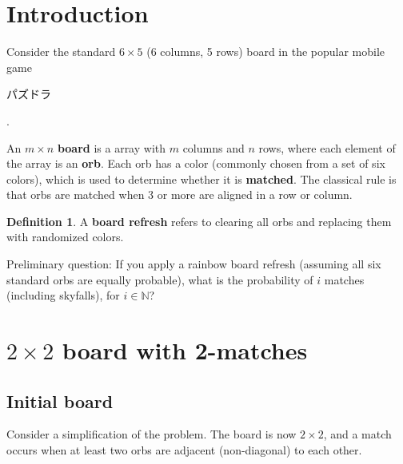 \documentclass[12pt]{article}
\newcommand{\N}{\mathbb{N}}
\theoremstyle{definition}
\newtheorem{definition}{Definition}[section]
\begin{document}
\tableofcontents
\section{Introduction}
Consider the standard $6\times 5$ (6 columns, 5 rows) board in the popular mobile game \begin{CJK}{UTF8}{min}パズドラ\end{CJK}.

An $m\times n$ \textbf{board} is a array with $m$ columns and $n$ rows, where each element of the array is an \textbf{orb}. Each orb has a color (commonly chosen from a set of six colors), which is used to determine whether it is \textbf{matched}. The classical rule is that orbs are matched when 3 or more are aligned in a row or column.

\begin{definition}
    A \textbf{board refresh} refers to clearing all orbs and replacing them with randomized colors.
\end{definition}

Preliminary question: If you apply a rainbow board refresh (assuming all six standard orbs are equally probable), what is the probability of $i$ matches (including skyfalls), for $i\in\N$?
\begin{comment}
This is a deceptively hard problem as far as I can tell. I hope there is a nice closed form solution, but there probably isn't since it seems to involve partitioning.
\end{comment}

\section[2x2 board with 2-matches]{$2\times2$ board with 2-matches}
\subsection{Initial board}
Consider a simplification of the problem.
The board is now $2 \times 2$, and a match occurs when at least two orbs are adjacent (non-diagonal) to each other.
\end{document}
